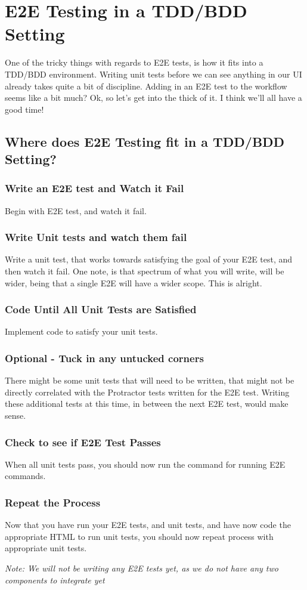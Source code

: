 
\section{ E2E Testing in a TDD/BDD Setting }

One of the tricky things with regards to E2E tests, is how it fits into a
TDD/BDD environment. Writing unit tests before we can see anything in our UI
already takes quite a bit of discipline. Adding in an E2E test to the workflow
seems like a bit much? Ok, so let's get into the thick of it. I think we'll all
have a good time!

\subsection{ Where does E2E Testing fit in a TDD/BDD Setting? }

\subsubsection{ Write an E2E test and Watch it Fail }
Begin with E2E test, and watch it fail.

\subsubsection{ Write Unit tests and watch them fail }
Write a unit test, that works towards satisfying the goal of your E2E test, and
then watch it fail. One note, is that spectrum of what you will write, will
be wider, being that a single E2E will have a wider scope. This is alright.

\subsubsection{ Code Until All Unit Tests are Satisfied }
Implement code to satisfy your unit tests.

\subsubsection{ Optional - Tuck in any untucked corners }
There might be some unit tests that will need to be written, that might not be
directly correlated with the Protractor tests written for the E2E test. Writing
these additional tests at this time, in between the next E2E test, would make
sense.

\subsubsection{ Check to see if E2E Test Passes }
When all unit tests pass, you should now run the command for running E2E
commands.

\subsubsection{ Repeat the Process }
Now that you have run your E2E tests, and unit tests, and have now code
the appropriate HTML to run unit tests, you should now repeat process with
appropriate unit tests.

\textit{Note: We will not be writing any E2E tests yet, as we do not have any
two components to integrate yet}
